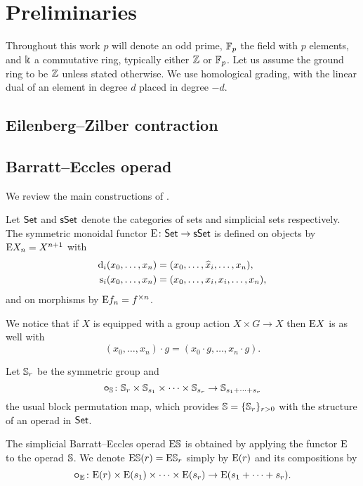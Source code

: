 
\section{Preliminaries}

Throughout this work $p$ will denote an odd prime, ${\mathbb{F}_p}$ the field with $p$ elements, and $\Bbbk$ a commutative ring, typically either $\mathbb{Z}$ or ${\mathbb{F}_p}$.
Let us assume the ground ring to be $\mathbb{Z}$ unless stated otherwise.
We use homological grading, with the linear dual of an element in degree $d$ placed in degree $-d$.

\subsection{Eilenberg--Zilber contraction}

\TBW

\subsection{Barratt--Eccles operad}

We review the main constructions of \cite{berger2004combinatorial}.

\sssec

Let $\mathsf{Set}$ and $\mathsf{sSet}$ denote the categories of sets and simplicial sets respectively.
The symmetric monoidal functor $\mathrm{E} \colon \mathsf{Set} \to \mathsf{sSet}$ is defined on objects by $\mathrm{E} X_n = X^{n+1}$ with
\[
\begin{split}
	\operatorname{d}_i(x_0,\dots,x_n) &= (x_0,\dots,\widehat{x}_i,\dots,x_n), \\
	\operatorname{s}_i(x_0,\dots,x_n) &= (x_0, \dots, x_i, x_i, \dots, x_n),
\end{split}
\]
and on morphisms by $\mathrm{E} f_n = f^{\times n}$.

We notice that if $X$ is equipped with a group action $X \times G \to X$ then $\mathrm{E} X$ is as well with
\[
(x_0,\dots,x_n) \cdot g = (x_0 \cdot g, \dots, x_n \cdot g).
\]

\sssec

Let $\mathbb{S}_r$ be the symmetric group and
\[
\bm{\circ}_{\mathbb{S}} \colon \mathbb{S}_r \times \mathbb{S}_{s_1} \times \cdots \times \mathbb{S}_{s_r} \to \mathbb{S}_{s_1+\dots+s_r}
\]
the usual block permutation map, which provides $\mathbb{S} = \{\mathbb{S}_r\}_{r>0}$ with the structure of an operad in $\mathsf{Set}$.

\sssec

The simplicial Barratt--Eccles operad $\mathrm{E}\mathbb{S}$ is obtained by applying the functor $\mathrm{E}$ to the operad $\mathbb{S}$.
We denote $\mathrm{E}\mathbb{S}(r) = \mathrm{E}\mathbb{S}_r$ simply by $\mathrm{E}(r)$ and its compositions by
\[
\bm{\circ}_{\mathrm{E}} \colon \mathrm{E}(r) \times \mathrm{E}(s_1) \times\dots\times \mathrm{E}(s_r) \to \mathrm{E}(s_1+\dots+s_r).
\]

